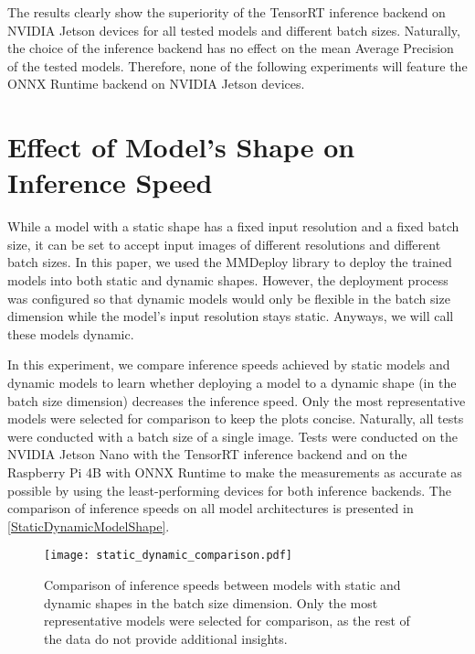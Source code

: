 The results clearly show the superiority of the TensorRT inference backend on
NVIDIA Jetson devices for all tested models and different batch sizes.
Naturally, the choice of the inference backend has no effect on the mean Average
Precision of the tested models. Therefore, none of the following experiments
will feature the ONNX Runtime backend on NVIDIA Jetson devices.







\section{Effect of Model's Shape on Inference Speed}

While a model with a static shape has a fixed input resolution and a
fixed batch size, it can be set to accept input images of different resolutions
and different batch sizes. In this paper, we used the MMDeploy library to deploy
the trained models into both static and dynamic shapes. However, the deployment
process was configured so that dynamic models would only be flexible in the
batch size dimension while the model's input resolution stays static. Anyways, we
will call these models dynamic.

In this experiment, we compare inference speeds achieved by static models and
dynamic models to learn whether deploying a model to a dynamic shape (in the
batch size dimension) decreases the inference speed. Only the most
representative models were selected for comparison to keep the plots concise.
Naturally, all tests were conducted with a batch size of a single image. Tests
were conducted on the NVIDIA Jetson Nano with the TensorRT inference backend and
on the Raspberry Pi 4B with ONNX Runtime to make the measurements as accurate as
possible by using the least-performing devices for both inference backends. The
comparison of inference speeds on all model architectures is presented in
\autoref{StaticDynamicModelShape}.

\begin{figure}[t]
    \begin{framed}
        \centering
        \texttt{[image: static\_dynamic\_comparison.pdf]}
        \caption{Comparison of inference speeds between models with static and
        dynamic shapes in the batch size dimension. Only the most representative
        models were selected for comparison, as the rest of the data do not
        provide additional insights.}
        \label{StaticDynamicModelShape}
    \end{framed}
\end{figure}

